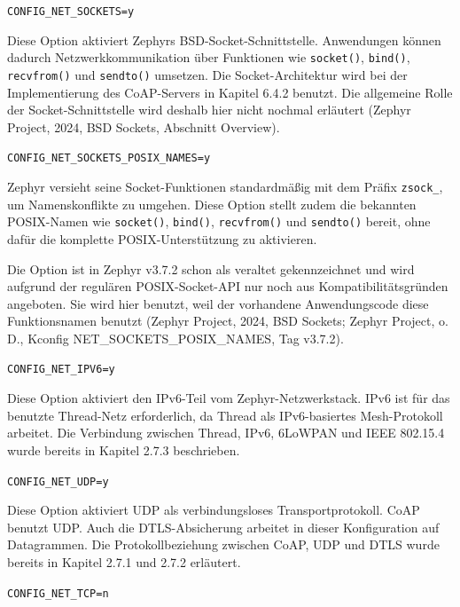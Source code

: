 \lstinline[style=codeinline]|CONFIG_NET_SOCKETS=y|

Diese Option aktiviert Zephyrs BSD-Socket-Schnittstelle. Anwendungen k{\"o}nnen dadurch Netzwerkkommunikation {\"u}ber Funktionen wie \lstinline[style=codeinline]|socket()|, \lstinline[style=codeinline]|bind()|, \lstinline[style=codeinline]|recvfrom()| und \lstinline[style=codeinline]|sendto()| umsetzen. Die Socket-Architektur wird bei der Implementierung des CoAP-Servers in Kapitel 6.4.2 benutzt. Die allgemeine Rolle der Socket-Schnittstelle wird deshalb hier nicht nochmal erl{\"a}utert (Zephyr Project, 2024, \glqq{}BSD Sockets\grqq{}, Abschnitt \glqq{}Overview\grqq{}).

\lstinline[style=codeinline]|CONFIG_NET_SOCKETS_POSIX_NAMES=y|

Zephyr versieht seine Socket-Funktionen standardm{\"a}{\ss}ig mit dem Pr{\"a}fix \lstinline[style=codeinline]|zsock_|, um Namenskonflikte zu umgehen. Diese Option stellt zudem die bekannten POSIX-Namen wie \lstinline[style=codeinline]|socket()|, \lstinline[style=codeinline]|bind()|, \lstinline[style=codeinline]|recvfrom()| und \lstinline[style=codeinline]|sendto()| bereit, ohne daf{\"u}r die komplette POSIX-Unterst{\"u}tzung zu aktivieren.

Die Option ist in Zephyr v3.7.2 schon als veraltet gekennzeichnet und wird aufgrund der regul{\"a}ren POSIX-Socket-API nur noch aus Kompatibilit{\"a}tsgr{\"u}nden angeboten. Sie wird hier benutzt, weil der vorhandene Anwendungscode diese Funktionsnamen benutzt (Zephyr Project, 2024, \glqq{}BSD Sockets\grqq{}; Zephyr Project, o. D., Kconfig NET\_SOCKETS\_POSIX\_NAMES, Tag v3.7.2).

\lstinline[style=codeinline]|CONFIG_NET_IPV6=y|

Diese Option aktiviert den IPv6-Teil vom Zephyr-Netzwerkstack. IPv6 ist f{\"u}r das benutzte Thread-Netz erforderlich, da Thread als IPv6-basiertes Mesh-Protokoll arbeitet. Die Verbindung zwischen Thread, IPv6, 6LoWPAN und IEEE 802.15.4 wurde bereits in Kapitel 2.7.3 beschrieben.

\lstinline[style=codeinline]|CONFIG_NET_UDP=y|

Diese Option aktiviert UDP als verbindungsloses Transportprotokoll. CoAP benutzt UDP. Auch die DTLS-Absicherung arbeitet in dieser Konfiguration auf Datagrammen. Die Protokollbeziehung zwischen CoAP, UDP und DTLS wurde bereits in Kapitel 2.7.1 und 2.7.2 erl{\"a}utert.

\lstinline[style=codeinline]|CONFIG_NET_TCP=n|

